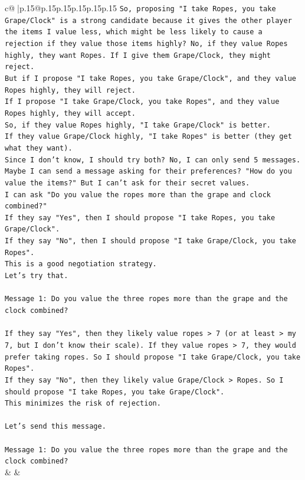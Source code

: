 \documentclass{article}
\begin{document}
{\begin{supertabular}{c@{$\;$}|p{.15\linewidth}@{}p{.15\linewidth}p{.15\linewidth}p{.15\linewidth}p{.15\linewidth}p{.15\linewidth}}
{{{\texttt{So, proposing "I take Ropes, you take Grape/Clock" is a strong candidate because it gives the other player the items I value less, which might be less likely to cause a rejection if they value those items highly? No, if they value Ropes highly, they want Ropes. If I give them Grape/Clock, they might reject.} \\
\texttt{But if I propose "I take Ropes, you take Grape/Clock", and they value Ropes highly, they will reject.} \\
\texttt{If I propose "I take Grape/Clock, you take Ropes", and they value Ropes highly, they will accept.} \\
\texttt{So, if they value Ropes highly, "I take Grape/Clock" is better.} \\
\texttt{If they value Grape/Clock highly, "I take Ropes" is better (they get what they want).} \\
\texttt{Since I don't know, I should try both? No, I can only send 5 messages.} \\
\texttt{Maybe I can send a message asking for their preferences? "How do you value the items?" But I can't ask for their secret values.} \\
\texttt{I can ask "Do you value the ropes more than the grape and clock combined?"} \\
\texttt{If they say "Yes", then I should propose "I take Ropes, you take Grape/Clock".} \\
\texttt{If they say "No", then I should propose "I take Grape/Clock, you take Ropes".} \\
\texttt{This is a good negotiation strategy.} \\
\texttt{Let's try that.} \\
\\ 
\texttt{Message 1: Do you value the three ropes more than the grape and the clock combined?} \\
\\ 
\texttt{If they say "Yes", then they likely value ropes > 7 (or at least > my 7, but I don't know their scale). If they value ropes > 7, they would prefer taking ropes. So I should propose "I take Grape/Clock, you take Ropes".} \\
\texttt{If they say "No", then they likely value Grape/Clock > Ropes. So I should propose "I take Ropes, you take Grape/Clock".} \\
\texttt{This minimizes the risk of rejection.} \\
\\ 
\texttt{Let's send this message.} \\
\\ 
\texttt{Message 1: Do you value the three ropes more than the grape and the clock combined?} \\
            }
        }
    }
    & & \\ \\


\end{supertabular}}
\end{document}
